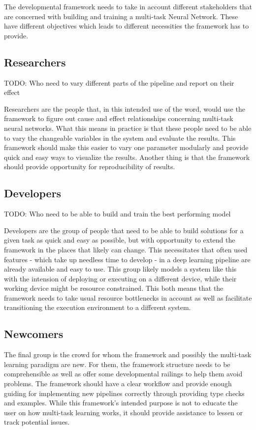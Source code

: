 The developmental framework needs to take in account different stakeholders that are concerned with building and training a multi-task Neural Network. These have different objectives which leads to different necessities the framework has to provide.

\subsection{Researchers}
TODO: Who need to vary different parts of the pipeline and report on their effect

Researchers are the people that, in this intended use of the word, would use the framework to figure out cause and effect relationships concerning multi-task neural networks. What this means in practice is that these people need to be able to vary the changeable variables in the system and evaluate the results. This framework should make this easier to vary one parameter modularly and provide quick and easy ways to visualize the results. Another thing is that the framework should provide opportunity for reproducibility of results.  

\subsection{Developers}
TODO: Who need to be able to build and train the best performing model

Developers are the group of people that need to be able to build solutions for a given task as quick and easy as possible, but with opportunity to extend the framework in the places that likely can change. This necessitates that often used features - which take up needless time to develop - in a deep learning pipeline are already available and easy to use. This group likely models a system like this with the intension of deploying or executing on a different device, while their working device might be resource constrained. This both means that the framework needs to take usual resource bottlenecks in account as well as facilitate transitioning the execution environment to a different system.

\subsection{Newcomers}

The final group is the crowd for whom the framework and possibly the multi-task learning paradigm are new. For them, the framework structure needs to be comprehensible as well as offer some developmental railings to help them avoid problems. The framework should have a clear workflow and provide enough guiding for implementing new pipelines correctly through providing type checks and examples. While  this framework's intended purpose is not to educate the user on how multi-task learning works, it should provide assistance to lessen or track potential issues.


